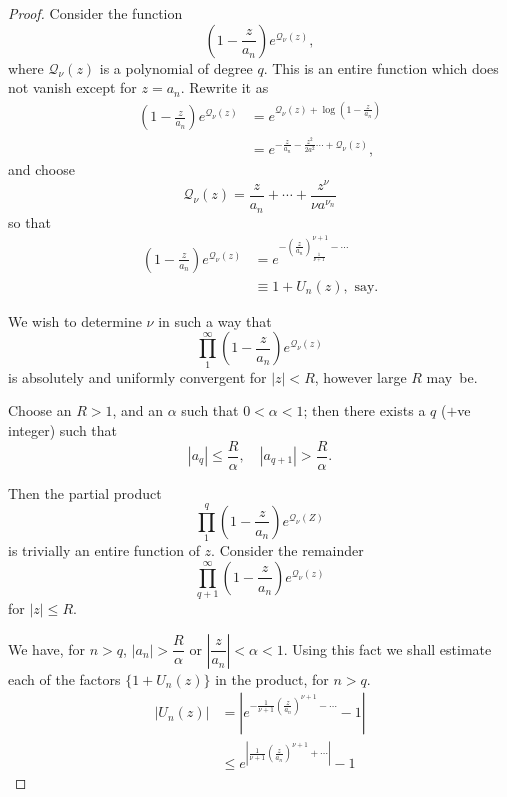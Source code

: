 \begin{proof}
Consider the function
$$
\left(1-\frac{z}{a_n} \right) e^{\mathcal{Q}_\nu (z)},
$$
where $\mathcal{Q}_\nu(z)$ is a polynomial of degree $q$. This is
an entire function which does not vanish except for $z = a_n$. Rewrite
it as 
\begin{align*}
\left(1- \frac{z}{a_n} \right) e^{\mathcal{Q}_\nu (z)} & =
e^{\mathcal{Q}_\nu (z) + \log \left(1-\frac{z}{a_n} \right)}\\
& = e^{ - \frac{z}{a_n} - \frac{z^2}{2a^2} \cdots + \mathcal{Q}_\nu(z)},
\end{align*}
and choose
$$
\mathcal{Q}_\nu(z) = \frac{z}{a_n} +\cdots + \frac{z^\nu}{\nu a^{\nu_n}}
$$
so that
\begin{align*}
\left(1-\frac{z}{a_n} \right) e^{\mathcal{Q}_\nu (z)} & =
e^{-\left(\frac{z}{a_n} \right)^{\nu +1}_{\frac{1}{\nu+1}} -\cdots} \\
& \equiv 1 + U_n (z), \text{ say.}
\end{align*}

We wish to determine $\nu$ in such a way that
$$
\prod\limits^\infty_1 \left(1-\frac{z}{a_n} \right) e^{\mathcal{Q}_\nu(z)}
$$\pageoriginale
is absolutely and uniformly convergent for $|z| < R$, however large
$R$ may~be.

\vfill\eject

Choose an $R >1$, and an $\alpha$ such that $0 < \alpha < 1$; then
there exists a $q$ ($+$ve integer) such that
$$
|a_q| \leq \frac{R}{\alpha}, \quad |a_{q+1}| > \frac{R}{\alpha}.
$$

Then the partial product
$$
\prod\limits^q_1 \left(1-\frac{z}{a_n} \right) e^{\mathcal{Q}_\nu (Z)}
$$
is trivially an entire function of $z$. Consider the remainder
$$
\prod\limits^\infty_{q+1} \left(1-\frac{z}{a_n} \right)
e^{\mathcal{Q}_\nu (z)}
$$
for $|z| \leq R$.

We have, for $n > q$, $|a_n| > \dfrac{R}{\alpha}$ or
$\left|\dfrac{z}{a_n} \right|< \alpha < 1$. Using this fact we shall
estimate each of the factors $\{1 + U_n (z)\}$ in the product, for
$n > q$.
\begin{align*}
|U_n(z)| & = \left|e^{-\frac{1}{\nu+1} \left(\frac{z}{a_n}
  \right)^{\nu+1} - \cdots } -1\right|  \\
& \leq e^{\left| \frac{1}{\nu+1} \left(\frac{z}{a_n} \right)^{\nu+1}
 + \cdots\right|} -1
\end{align*}
\end{proof}

